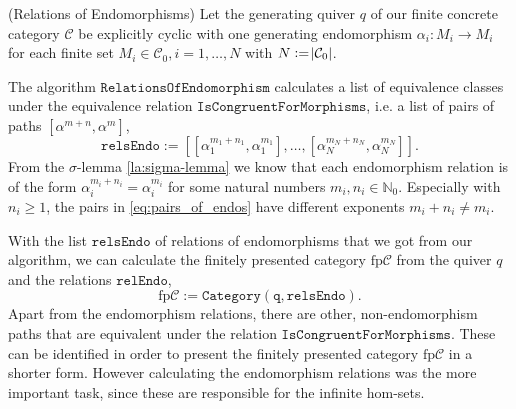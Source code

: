 \begin{remark}{(Relations of Endomorphisms)}
Let the generating quiver $q$ of our finite concrete category $\mathcal{C}$ be explicitly cyclic with one generating endomorphism
$\alpha_{i} : M_{i} \rightarrow M_{i}$ for each finite set $M_{i} \in \mathcal{C}_{0}, i = 1,\dots,N$ with $N := \abs{\mathcal{C}_{0}}$.

The algorithm $\mathtt{RelationsOfEndomorphism}$ calculates a list of equivalence classes under the equivalence relation
$\mathtt{IsCongruentForMorphisms}$, i.e. a list of pairs of paths $[\alpha^{m+n}, \alpha^{m}]$,
\begin{equation}
\mathtt{relsEndo} :=\label{eq:pairs_of_endos}
[ [\alpha_{1}^{m_{1}+n_{1}}, \alpha_{1}^{m_{1}}], \dots, [\alpha_{N}^{m_{N}+n_{N}}, \alpha_{N}^{m_{N}}] ].
\end{equation}
From the $\sigma$-lemma \ref{la:sigma-lemma} we know that each endomorphism relation is of the form
$\alpha_{i}^{m_{i}+n_{i}} = \alpha_{i}^{m_{i}}$ for some natural numbers $m_{i}, n_{i} \in \mathbb{N}_{0}$.
Especially with $n_{i} \geq 1$, the pairs in \eqref{eq:pairs_of_endos} have different exponents $m_{i}+n_{i} \neq m_{i}$.

With the list $\mathtt{relsEndo}$ of relations of endomorphisms that we got from our algorithm, we can calculate the
finitely presented category $\text{fp}\mathcal{C}$ from the quiver $q$ and the relations $\mathtt{relEndo}$,
\[
\text{fp}\mathcal{C} := \mathtt{Category}(\mathtt{q}, \mathtt{relsEndo}).
\]
Apart from the endomorphism relations, there are other, non-endomorphism paths that are equivalent under the relation
$\mathtt{IsCongruentForMorphisms}$. These can be identified in order to present the finitely presented category
$\text{fp}\mathcal{C}$ in a shorter form. However calculating the endomorphism relations was the more important task,
since these are responsible for the infinite hom-sets.
\end{remark}

